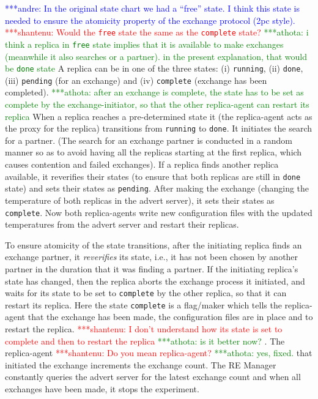 \documentclass{rspublic}
\newcommand{\jhanote}[1]{ {\textcolor{red} { ***shantenu: #1 }}}
\newcommand{\alnote}[1]{ {\textcolor{blue} { ***andre: #1 }}}
\newcommand{\athotanote}[1]{ {\textcolor{green} { ***athota: #1 }}}
\newcommand{\alnote}[1]{}
\newcommand{\athotanote}[1]{}
\newcommand{\jhanote}[1]{}
\begin{document}
\alnote{In the original state chart we had a ``free'' state. I think
  this state is needed to ensure the atomicity property of the
  exchange protocol (2pc style).} \jhanote{Would the \texttt{free}
  state the same as the \texttt{complete} state?} \athotanote{i think a replica in \texttt{free} state implies that it is available to make exchanges (meanwhile it also searches or a partner). in the present explanation, that would be \texttt{done} state}   A replica can be in
one of the three states: (i) \texttt{running}, (ii) \texttt{done},
(iii) \texttt{pending} (for an exchange) and (iv) \texttt{complete}
(exchange has been completed). \athotanote{after an exchange is
  complete, the state has to be set as complete by the
  exchange-initiator, so that the other replica-agent can restart its
  replica} When a replica reaches a pre-determined state it (the
replica-agent acts as the proxy for the replica) transitions from
\texttt{running} to \texttt{done}. It initiates the search for a
partner.  (The search for an exchange partner is conducted in a random
manner so as to avoid having all the replicas starting at the first
replica, which causes contention and failed exchanges).  If a replica
finds another replica available, it reverifies their states (to ensure
that both replicas are still in \texttt{done} state) and sets their
states as \texttt{pending}. After making the exchange (changing the
temperature of both replicas in the advert server), it sets their
states as \texttt{complete}. Now both replica-agents write new
configuration files with the updated temperatures from the advert
server and restart their replicas.

To ensure atomicity of the state transitions, after the initiating
replica finds an exchange partner, it {\it reverifies} its state,
i.e., it has not been chosen by another partner in the duration that
it was finding a partner.  If the initiating replica's state has
changed, then the replica aborts the exchange process it initiated,
and waits for its state to be set to \texttt{complete} by the other replica, so that it can
restart its replica. Here the state \texttt{complete} is a flag/maker which tells the replica-agent that the exchange has been made, the configuration files are in place and to restart the replica. \jhanote{I don't understand how its state is set
  to complete and then to restart the replica} \athotanote{is it better now?}.  The replica-agent
\jhanote{Do you mean replica-agent?} \athotanote{yes, fixed.} that initiated the exchange
increments the exchange count. The RE Manager constantly queries the
advert server for the latest exchange count and when all exchanges
have been made, it stops the experiment.
\end{document}
